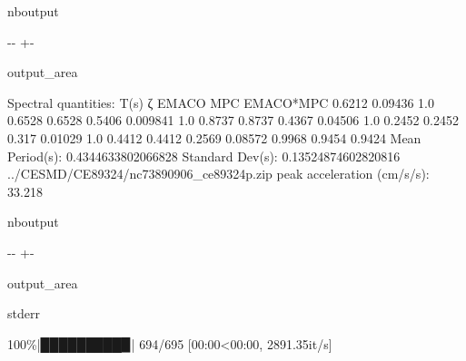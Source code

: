 \documentclass[letterpaper,10pt,english]{sphinxmanual}
\begin{document}
\begin{sphinxuseclass}{nboutput}
{

\kern-\sphinxverbatimsmallskipamount\kern-\baselineskip
\kern+\FrameHeightAdjust\kern-\fboxrule
\vspace{\nbsphinxcodecellspacing}

\begin{sphinxuseclass}{output_area}
\begin{sphinxuseclass}{}


\begin{sphinxVerbatim}[commandchars=\\\{\}]
Spectral quantities:
       T(s)        ζ        EMACO        MPC     EMACO*MPC
      0.6212     0.09436    1.0        0.6528     0.6528
      0.5406     0.009841   1.0        0.8737     0.8737
      0.4367     0.04506    1.0        0.2452     0.2452
      0.317      0.01029    1.0        0.4412     0.4412
      0.2569     0.08572    0.9968     0.9454     0.9424
Mean Period(s): 0.4344633802066828
Standard Dev(s): 0.13524874602820816
../CESMD/CE89324/nc73890906\_ce89324p.zip
peak acceleration (cm/s/s): 33.218
\end{sphinxVerbatim}



\end{sphinxuseclass}
\end{sphinxuseclass}
}

\end{sphinxuseclass}
\begin{sphinxuseclass}{nboutput}
{

\kern-\sphinxverbatimsmallskipamount\kern-\baselineskip
\kern+\FrameHeightAdjust\kern-\fboxrule
\vspace{\nbsphinxcodecellspacing}

\begin{sphinxuseclass}{output_area}
\begin{sphinxuseclass}{stderr}


\begin{sphinxVerbatim}[commandchars=\\\{\}]
100\%|█████████▉| 694/695 [00:00<00:00, 2891.35it/s]
\end{sphinxVerbatim}



\end{sphinxuseclass}
\end{sphinxuseclass}
}

\end{sphinxuseclass}
\end{document}
